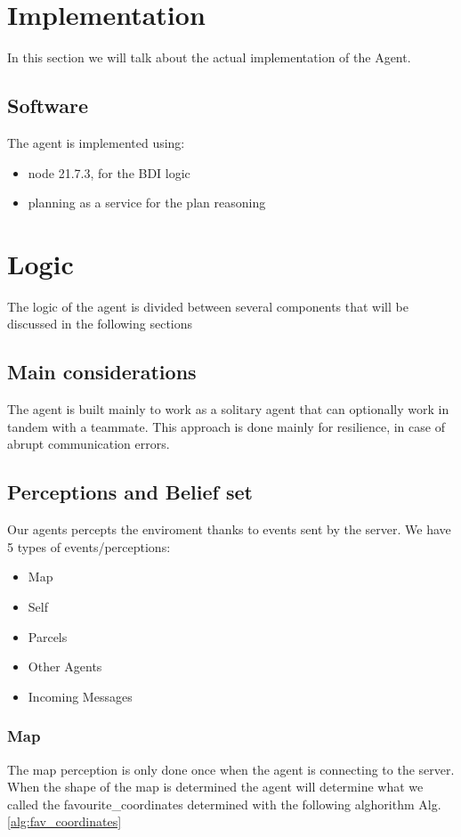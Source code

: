 \documentclass[conference]{IEEEtran}
\begin{document}
\section{Implementation}
In this section we will talk about the actual implementation of the Agent.


\subsection{Software}
The agent is implemented using:
\begin{itemize}
    \item node 21.7.3, for the BDI logic
    \item planning as a service for the plan reasoning
\end{itemize}

\section{Logic}
The logic of the agent is divided between several components that will be discussed in the following sections
\subsection{Main considerations}
The agent is built mainly to work as a solitary agent that can optionally work in tandem with a teammate.
This approach is done mainly for resilience, in case of abrupt communication errors.

\subsection{Perceptions and Belief set}
Our agents percepts the enviroment thanks to events sent by the server.
We have 5 types of events/perceptions:
\begin{itemize}
    \item Map
    \item Self
    \item Parcels
    \item Other Agents
    \item Incoming Messages
\end{itemize}


\subsubsection{Map}
The map perception is only done once when the agent is connecting to the server.
When the shape of the map is determined the agent will determine what we called the favourite\_coordinates determined with the following alghorithm Alg.\ref{alg:fav_coordinates}
\end{document}
